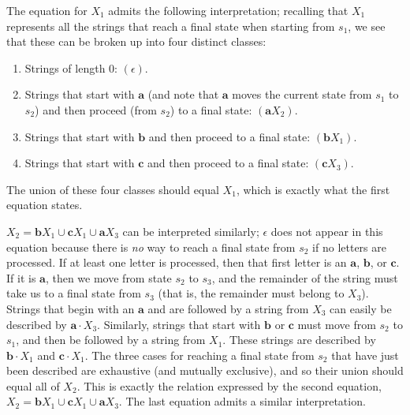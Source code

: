 The equation for $X_1$ admits the following interpretation; recalling that $X_1$
represents all the strings that reach a final state when starting from $s_1$, we
see that these can be broken up into four distinct classes:
\begin{enumerate}
\item Strings of length 0: $(\epsilon)$.
\item Strings that start with $\pmb{a}$ (and note that $\pmb{a}$ moves the current
	state from $s_1$ to $s_2$) and then proceed (from $s_2$) to a final
	state: $(\pmb{a}X_2)$.
\item Strings that start with $\pmb{b}$ and then proceed to a final state:
	$(\pmb{b}X_1)$.
\item Strings that start with $\pmb{c}$ and then proceed to a final state:
	$(\pmb{c}X_3)$.
\end{enumerate}
The union of these four classes should equal $X_1$, which is exactly what the
first equation states.

$X_2 = \pmb{b}X_1 \cup \pmb{c}X_1 \cup \pmb{a}X_3$ can be interpreted similarly;
$\epsilon$ does not appear in this equation because there is \emph{no} way to
reach a final state from $s_2$ if no letters are processed. If at least one
letter is processed, then that first letter is an $\pmb{a}$, $\pmb{b}$, or $\pmb{c}$.
If it is $\pmb{a}$, then we move from state $s_2$ to $s_3$, and the remainder of
the string must take us to a final state from $s_3$ (that is, the remainder must
belong to $X_3$). Strings that begin with an $\pmb{a}$ and are followed by a
string from $X_3$ can easily be described by $\pmb{a}\cdot X_3$. Similarly,
strings that start with $\pmb{b}$ or $\pmb{c}$ must move from $s_2$ to $s_1$, and
then be followed by a string from $X_1$. These strings are described by
$\pmb{b}\cdot X_1$ and $\pmb{c}\cdot X_1$. The three cases for reaching a final
state from $s_2$ that have just been described are exhaustive (and mutually
exclusive), and so their union should equal all of $X_2$. This is exactly the
relation expressed by the second equation, $X_2=\pmb{b}X_1 \cup \pmb{c}X_1 \cup
\pmb{a}X_3$. The last equation admits a similar interpretation.

